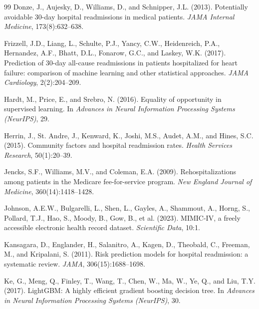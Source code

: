 \documentclass[11pt,letterpaper]{article}
\begin{document}
\begin{thebibliography}{99}
Donze, J., Aujesky, D., Williams, D., and Schnipper, J.L. (2013).
\newblock Potentially avoidable 30-day hospital readmissions in medical patients.
\newblock \textit{JAMA Internal Medicine}, 173(8):632--638.

Frizzell, J.D., Liang, L., Schulte, P.J., Yancy, C.W., Heidenreich, P.A., Hernandez, A.F., Bhatt, D.L., Fonarow, G.C., and Laskey, W.K. (2017).
\newblock Prediction of 30-day all-cause readmissions in patients hospitalized for heart failure: comparison of machine learning and other statistical approaches.
\newblock \textit{JAMA Cardiology}, 2(2):204--209.

Hardt, M., Price, E., and Srebro, N. (2016).
\newblock Equality of opportunity in supervised learning.
\newblock In \textit{Advances in Neural Information Processing Systems (NeurIPS)}, 29.

Herrin, J., St. Andre, J., Kenward, K., Joshi, M.S., Audet, A.M., and Hines, S.C. (2015).
\newblock Community factors and hospital readmission rates.
\newblock \textit{Health Services Research}, 50(1):20--39.

Jencks, S.F., Williams, M.V., and Coleman, E.A. (2009).
\newblock Rehospitalizations among patients in the Medicare fee-for-service program.
\newblock \textit{New England Journal of Medicine}, 360(14):1418--1428.

Johnson, A.E.W., Bulgarelli, L., Shen, L., Gayles, A., Shammout, A., Horng, S., Pollard, T.J., Hao, S., Moody, B., Gow, B., et al. (2023).
\newblock MIMIC-IV, a freely accessible electronic health record dataset.
\newblock \textit{Scientific Data}, 10:1.

Kansagara, D., Englander, H., Salanitro, A., Kagen, D., Theobald, C., Freeman, M., and Kripalani, S. (2011).
\newblock Risk prediction models for hospital readmission: a systematic review.
\newblock \textit{JAMA}, 306(15):1688--1698.

Ke, G., Meng, Q., Finley, T., Wang, T., Chen, W., Ma, W., Ye, Q., and Liu, T.Y. (2017).
\newblock LightGBM: A highly efficient gradient boosting decision tree.
\newblock In \textit{Advances in Neural Information Processing Systems (NeurIPS)}, 30.


\end{thebibliography}
\end{document}

